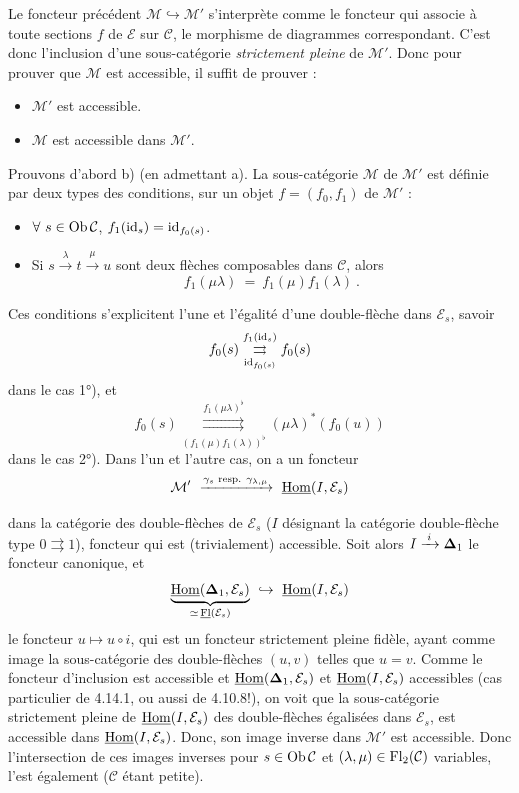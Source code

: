 Le foncteur précédent $\mathcal{M} \hookrightarrow \mathcal{M}'$ s’interprète comme le foncteur qui associe à toute sections $f$ de $\mathcal{E}$ sur $\mathcal{C}$, le morphisme de diagrammes correspondant. C’est donc l’inclusion d’une sous-catégorie \textit{strictement pleine} de $\mathcal{M}'$. Donc pour prouver que $\mathcal{M}$ est accessible, il suffit de prouver : %
\begin{itemize}[leftmargin=2.5em]
\item[a)] $\mathcal{M}'$ est accessible.
\item[b)] $\mathcal{M}$ est accessible dans $\mathcal{M}'$.
\end{itemize}
Prouvons d’abord b) (en admettant a). La sous-catégorie $\mathcal{M}$ de $\mathcal{M}'$ est définie par deux types des conditions, sur un objet $f = (f_0,f_1)$ de $\mathcal{M}'$ :
\begin{itemize}[leftmargin=2.5em]
\item[1°)] $\forall\ s \in \operatorname{Ob}\mathcal{C}$, $f_1(\mathrm{id}_s) = \mathrm{id}_{f_0(s)}$.
\item[2°)] Si $s \xrightarrow{\lambda} t \xrightarrow{\mu} u$ sont deux flèches composables dans $\mathcal{C}$, alors
\[
f_1(\mu\lambda) \ = \ f_1(\mu)f_1(\lambda) \ .
\]
\end{itemize}
Ces conditions s’explicitent l’une et l’égalité d’une double-flèche dans $\mathcal{E}_s$,
savoir
\[
f_0(s) \overset{f_1(\mathrm{id}_s)}{\underset{\mathrm{id}_{f_0(s)}}{\rightrightarrows}} f_0(s)
\]
dans le cas 1°), et
\[
f_0(s) \overset{f_1(\mu\lambda)^\flat}{\underset{(f_1(\mu)f_1(\lambda))^\flat}{\rightrightarrows}} (\mu\lambda)^*(f_0(u))
\]
dans le cas 2°). Dans l’un et l’autre cas, on a un foncteur
\[
\mathcal{M}' \ \xrightarrow{\gamma_s \text{ resp. } \gamma_{\lambda,\mu}} \ \underline{\mathrm{Hom}}(I,\mathcal{E}_s)
\]

dans la catégorie des double-flèches de $\mathcal{E}_s$ ($I$ désignant la catégorie double-flèche type $0\rightrightarrows 1$), foncteur qui est (trivialement) accessible. Soit alors $I\xrightarrow{\;i\;}\boldsymbol{\Delta}_1$ le foncteur canonique, et
\[
\underbrace{\uHom(\bDelta_1,\mathcal{E}_s)}_{\simeq\,\uFl(\mathcal{E}_s)}\ \hookrightarrow\ \uHom(I,\mathcal{E}_s)
\]
le foncteur $u\longmapsto u\circ i$, qui est un foncteur strictement pleine fidèle, ayant comme image la sous-catégorie des double-flèches $(u,v)$ telles que $u=v$. Comme le foncteur d'inclusion est accessible et $\underline{\mathrm{Hom}}(\boldsymbol{\Delta}_1,\mathcal{E}_s)$ et $\underline{\mathrm{Hom}}(I,\mathcal{E}_s)$ accessibles
(cas particulier de 4.14.1, ou aussi de 4.10.8!), on voit que la sous-catégorie strictement pleine de $\underline{\mathrm{Hom}}(I,\mathcal{E}_s)$ des double-flèches égalisées dans $\mathcal{E}_s$, est accessible dans $\underline{\mathrm{Hom}}(I,\mathcal{E}_s)$. Donc, son image inverse dans $\mathcal{M}'$ est accessible. Donc l'intersection de ces images inverses pour $s\in\operatorname{Ob}\mathcal{C}$ et $(\lambda,\mu)\in\operatorname{Fl}_2(\mathcal{C})$ variables, l'est également ($\mathcal{C}$ étant petite).

